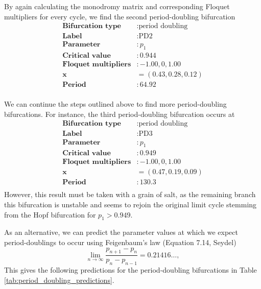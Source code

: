 By again calculating the monodromy matrix and corresponding Floquet multipliers for every cycle, we find the second period-doubling bifurcation
\begin{align*}
    \textbf{Bifurcation type} & : \text{period doubling} \\
    \textbf{Label} &: \text{PD2} \\
    \textbf{Parameter} & : p_1 \\
    \textbf{Critical value} & : 0.944 \\
    \textbf{Floquet multipliers} & : -1.00, 0, 1.00 \\
    \mathbf{x}  & = (0.43, 0.28, 0.12) \\
    \textbf{Period} & : 64.92 \\
\end{align*}

We can continue the steps outlined above to find more period-doubling bifurcations. 
For instance, the third period-doubling bifurcation occurs at
\begin{align*}
    \textbf{Bifurcation type} & : \text{period doubling} \\
    \textbf{Label} &: \text{PD3} \\
    \textbf{Parameter} & : p_1 \\
    \textbf{Critical value} & : 0.949 \\
    \textbf{Floquet multipliers} & : -1.00, 0, 1.00 \\
    \mathbf{x}  & = (0.47, 0.19, 0.09) \\
    \textbf{Period} & : 130.3 \\
\end{align*}
However, this result must be taken with a grain of salt, as the remaining branch this bifurcation is unstable and seems
to rejoin the original limit cycle stemming from the Hopf bifurcation for $p_1 > 0.949$. 

As an alternative, we can predict the parameter values at which we expect period-doublings 
to occur using Feigenbaum's law (Equation 7.14, Seydel)
\begin{equation}
    \lim_{n \to \infty} \frac{p_{n+1} - p_n}{p_{n} - p_{n-1}} = 0.21416 \dots,
\label{eq:feigenbaum}
\end{equation}
This gives the following predictions for the period-doubling bifurcations in Table \ref{tab:period_doubling_predictions}.

